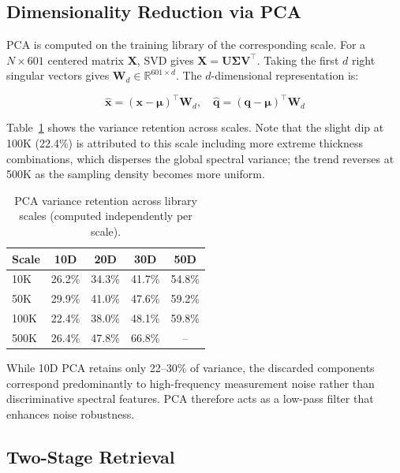 \documentclass[final,5p,times]{elsarticle}
\begin{document}
\subsection{Dimensionality Reduction via PCA}

PCA is computed on the training library of the corresponding scale. For a $N \times 601$ centered matrix $\mathbf{X}$, SVD gives $\mathbf{X} = \mathbf{U}\mathbf{\Sigma}\mathbf{V}^\top$. Taking the first $d$ right singular vectors gives $\mathbf{W}_d \in \mathbb{R}^{601 \times d}$. The $d$-dimensional representation is:

\begin{equation}
\hat{\mathbf{x}} = (\mathbf{x} - \boldsymbol{\mu})^\top \mathbf{W}_d, \quad
\hat{\mathbf{q}} = (\mathbf{q} - \boldsymbol{\mu})^\top \mathbf{W}_d
\label{eq:pca_proj}
\end{equation}

Table~\ref{tab:pca_var} shows the variance retention across scales. Note that the slight dip at 100K (22.4\%) is attributed to this scale including more extreme thickness combinations, which disperses the global spectral variance; the trend reverses at 500K as the sampling density becomes more uniform.

\begin{table}[H]
\centering
\caption{PCA variance retention across library scales (computed independently per scale).}
\label{tab:pca_var}
\begin{tabular}{lcccc}
\toprule
Scale & 10D & 20D & 30D & 50D \\
\midrule
10K & 26.2\% & 34.3\% & 41.7\% & 54.8\% \\
50K & 29.9\% & 41.0\% & 47.6\% & 59.2\% \\
100K & 22.4\% & 38.0\% & 48.1\% & 59.8\% \\
500K & 26.4\% & 47.8\% & 66.8\% & -- \\
\bottomrule
\end{tabular}
\end{table}

While 10D PCA retains only 22--30\% of variance, the discarded components correspond predominantly to high-frequency measurement noise rather than discriminative spectral features. PCA therefore acts as a low-pass filter that enhances noise robustness.

\subsection{Two-Stage Retrieval}
\end{document}
